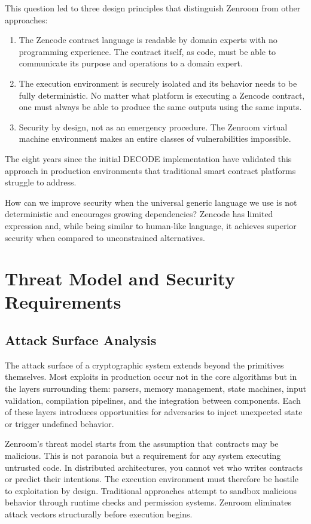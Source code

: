 This question led to three design principles that distinguish Zenroom
from other approaches:

\begin{enumerate}
\item The Zencode contract language is readable by domain experts with
  no programming experience. The contract itself, as code, must be
  able to communicate its purpose and operations to a domain expert.

\item The execution environment is securely isolated and its behavior
  needs to be fully deterministic. No matter what platform is
  executing a Zencode contract, one must always be able to produce the
  same outputs using the same inputs.

\item Security by design, not as an emergency procedure. The Zenroom
  virtual machine environment makes an entire classes of
  vulnerabilities impossible.
\end{enumerate}

The eight years since the initial DECODE implementation have validated
this approach in production environments that traditional smart
contract platforms struggle to address.

How can we improve security when the universal generic language we use
is not deterministic and encourages growing dependencies? Zencode has
limited expression and, while being similar to human-like language, it
achieves superior security when compared to unconstrained
alternatives.

\section{Threat Model and Security Requirements}

\subsection{Attack Surface Analysis}

The attack surface of a cryptographic system extends beyond the
primitives themselves. Most exploits in production occur not in the
core algorithms but in the layers surrounding them: parsers, memory
management, state machines, input validation, compilation pipelines,
and the integration between components. Each of these layers
introduces opportunities for adversaries to inject unexpected state or
trigger undefined behavior.

Zenroom's threat model starts from the assumption that contracts may
be malicious. This is not paranoia but a requirement for any system
executing untrusted code. In distributed architectures, you cannot vet
who writes contracts or predict their intentions. The execution
environment must therefore be hostile to exploitation by
design. Traditional approaches attempt to sandbox malicious behavior
through runtime checks and permission systems. Zenroom eliminates
attack vectors structurally before execution begins.

